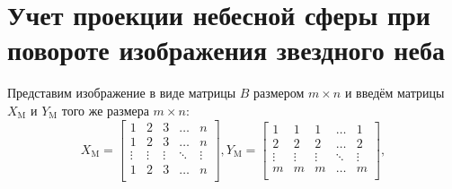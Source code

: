 \documentclass[12pt,a4paper]{article}
\begin{document}
\section{Учет проекции небесной сферы при повороте изображения звездного неба} \label{app:postprocessing}
Представим изображение в виде матрицы $B$ размером $m \times n$ и введём матрицы $X_{\text{M}}$ и $Y_{\text{M}}$ того же размера $m \times n$:
\begin{equation}\label{eq:eq16}
X_{\text{M}}=
\begin{bmatrix}
1 & 2 & 3 & \dots  & n \\
1 & 2 & 3 & \dots  & n \\
\vdots & \vdots & \vdots & \ddots & \vdots \\
1 & 2 & 3 & \dots  & n \\
\end{bmatrix}, 
Y_{\text{M}}=
\begin{bmatrix}
1 & 1 & 1 & \dots  & 1 \\
2 & 2 & 2 & \dots  & 2 \\
\vdots & \vdots & \vdots & \ddots & \vdots \\
m & m & m & \dots  & m \\
\end{bmatrix},
\end{equation}
\end{document}
